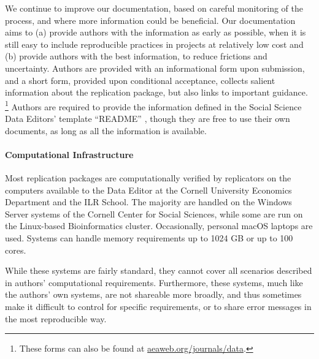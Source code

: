We continue to improve our documentation, based on careful monitoring of the process, and where more information could be beneficial. Our documentation aims to (a) provide authors with the information as early as possible, when it is still easy to include reproducible practices in projects at relatively low cost and (b) provide authors with the best information, to reduce frictions and uncertainty.  Authors are provided with an informational form upon submission, and a short form, provided upon conditional acceptance, collects salient information about the replication package, but also links to important guidance.%
\footnote{These forms can also be found at \href{https://www.aeaweb.org/journals/data}{aeaweb.org/journals/data}.} 
Authors are required to provide the information defined in the Social Science Data Editors' template ``README'' \citep{READMEv1.1.0}, though they are free to use their own documents, as long as all the information is available.

\paragraph{Computational Infrastructure}

Most replication packages are computationally verified by replicators on the computers available to the Data Editor at the Cornell University Economics Department and the ILR School. The majority are handled on the Windows Server systems of the Cornell Center for Social Sciences, while some are run on the Linux-based Bioinformatics cluster. Occasionally, personal macOS laptops are used. Systems can handle memory requirements up to 1024 GB or up to 100 cores. 

While these systems are fairly standard, they cannot cover all scenarios described in authors' computational requirements. Furthermore, these systems, much like the authors' own systems, are not shareable more broadly, and thus sometimes make it difficult to control for specific requirements, or to share error messages in the most reproducible way.  

